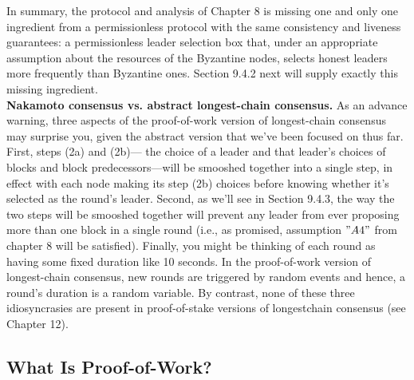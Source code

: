 In summary, the protocol and analysis of Chapter 8 is missing one and only one ingredient
from a permissionless protocol with the same consistency and liveness guarantees: a permissionless leader selection box that, under an appropriate assumption about the resources of
the Byzantine nodes, selects honest leaders more frequently than Byzantine ones. Section 9.4.2
next will supply exactly this missing ingredient.\\

\noindent
\textbf{Nakamoto consensus vs. abstract longest-chain consensus.} As an advance warning,
three aspects of the proof-of-work version of longest-chain consensus may surprise you, given
the abstract version that we've been focused on thus far. First, steps (2a) and (2b)—
the choice of a leader and that leader’s choices of blocks and block predecessors—will be
smooshed together into a single step, in effect with each node making its step (2b) choices
before knowing whether it’s selected as the round’s leader. Second, as we’ll see in Section 9.4.3,
the way the two steps will be smooshed together will prevent any leader from ever
proposing more than one block in a single round (i.e., as promised, assumption $"A4"$ from chapter 8 will be satisfied). Finally, you might be thinking of each round as having some fixed duration like 10 seconds. In the proof-of-work version of longest-chain consensus, new
rounds are triggered by random events and hence, a round’s duration is a random variable. By
contrast, none of these three idiosyncrasies are present in proof-of-stake versions of longestchain consensus (see Chapter 12).

\subsection{What Is Proof-of-Work?}
\noindent

